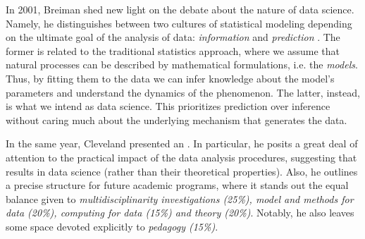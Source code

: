 In 2001, Breiman shed new light on the debate about the nature of data science. Namely, he distinguishes between two cultures of statistical modeling depending on the ultimate goal of the analysis of data: \textit{information} and \textit{prediction} \cite{breiman2001statistical}.
The former is related to the traditional statistics approach, where we assume that natural processes can be described by mathematical formulations, i.e. the \textit{models}. Thus, by fitting them to the data we can infer knowledge about the model's parameters and understand the dynamics of the phenomenon.
The latter, instead, is what we intend as data science. This prioritizes prediction over inference without caring much about the underlying mechanism that generates the data.

In the same year, Cleveland presented an  \cite{cleveland2001data}. In particular, he posits a great deal of attention to the practical impact of the data analysis procedures, suggesting that  results in data science  (rather than their theoretical properties).
Also, he outlines a precise structure for future academic programs, where it stands out the equal balance given to \textit{multidisciplinarity investigations (25\%), model and methods for data (20\%), computing for data (15\%) and theory (20\%)}. 
Notably, he also leaves some space devoted explicitly to \textit{pedagogy (15\%)}. 

